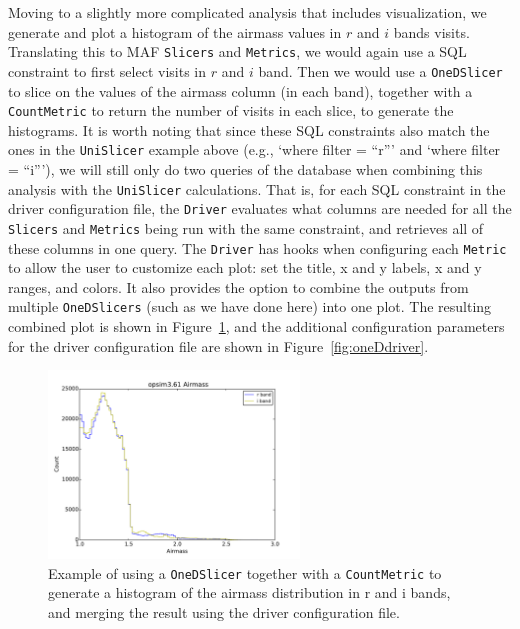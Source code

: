 \documentclass[]{spie}  %
\begin{document}
Moving to a slightly more complicated analysis that includes
visualization, we generate and plot a histogram
of the airmass values in $r$ and $i$ bands visits. Translating this to
MAF {\tt Slicers} and {\tt Metrics}, we would again use a SQL constraint to first
select visits in $r$ and $i$ band. Then we would use a {\tt OneDSlicer} to
slice on the values of the airmass column (in each band), together
with a {\tt CountMetric} to return the number of visits in each slice, to
generate the histograms. It is worth noting that since these SQL
constraints also match the ones in the {\tt UniSlicer} example above (e.g.,
`where filter = ``r''' and `where filter = ``i'''), we will still only
do two queries of the database when combining this analysis with the
{\tt UniSlicer} calculations. That is, for each SQL constraint in the driver
configuration file, the {\tt Driver} evaluates what columns are needed for
all the {\tt Slicers} and {\tt Metrics} being run with the same constraint, and
retrieves all of these columns in one query. The {\tt Driver} has hooks when
configuring each {\tt Metric} to allow the user to customize each plot: set
the title, x and y labels, x and y ranges, and colors. It also
provides the option to combine the outputs from multiple {\tt OneDSlicers}
(such as we have done here) into one plot. The resulting combined plot
is shown in Figure~\ref{fig:OneD}, and the additional configuration
parameters for the driver configuration file are shown in
Figure~\ref{fig:oneDdriver}. 

\begin{figure}
\centering
\includegraphics[height=5cm]{figures/opsim3_61__opsim3_61_Airmass_ONED_Histogram}
\caption[]
{ \label{fig:OneD}Example of using a {\tt OneDSlicer} together with a
  {\tt CountMetric} to generate a histogram of the airmass distribution in r and i
bands, and merging the result using the driver configuration file. 
}
\end{figure}
\end{document}
